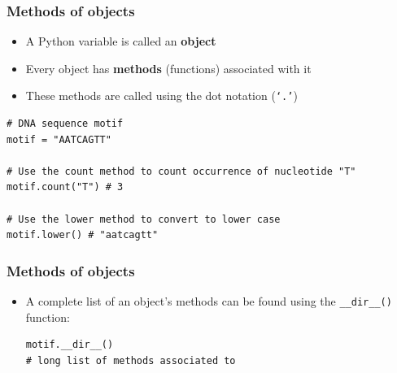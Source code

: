 \documentclass[xcolor=table]{beamer}
\begin{document}
\begin{frame}[fragile]
\frametitle{Methods of objects}

\begin{itemize}\addtolength{\itemsep}{0.5\baselineskip}
	\item A Python variable is called an \textbf{object}
	\item Every object has \textbf{methods} (functions) associated with it
	\item These methods are called using the dot notation (\texttt{`.'})
\end{itemize}
\begin{lstlisting}[style=python]
# DNA sequence motif
motif = "AATCAGTT"

# Use the count method to count occurrence of nucleotide "T" 
motif.count("T") # 3

# Use the lower method to convert to lower case
motif.lower() # "aatcagtt"
\end{lstlisting} 
\end{frame}


\begin{frame}[fragile]
\frametitle{Methods of objects}

\begin{itemize}\addtolength{\itemsep}{0.5\baselineskip}
    \item A complete list of an object's methods can be found using the \texttt{\_\_dir\_\_()} function:
\begin{lstlisting}[style=python]
motif.__dir__()
# long list of methods associated to 
\end{lstlisting} 
\end{itemize}
\end{frame}

\end{document}
